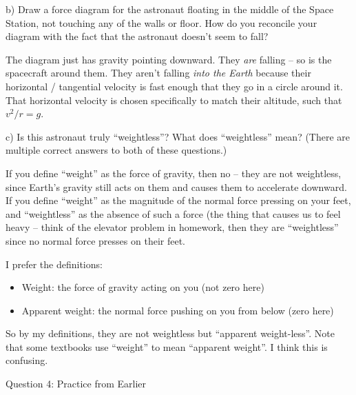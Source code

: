 \documentclass[12pt]{article}
\begin{document}
\vspace{2in}

b) Draw a force diagram for the astronaut floating in the middle of the Space Station, not touching
any of the walls or floor. How do you reconcile your diagram with the fact that the astronaut
doesn't seem to fall?

{\color{Red} The diagram just has gravity pointing downward. They {\it are} falling -- so is the spacecraft around them. They aren't falling {\it into the Earth} because their horizontal / tangential velocity is fast enough that they go in a circle around it. That horizontal velocity is chosen specifically to match their altitude, such that $v^2/r = g$.}

\vspace{2in}

c) Is this astronaut truly ``weightless''? What does ``weightless'' mean? (There are multiple correct answers to both of these questions.)

{\color{Red} If you define ``weight'' as the force of gravity, then no -- they are not weightless, since Earth's gravity still acts on them and causes them to accelerate downward. If you define ``weight'' as the magnitude of the normal force pressing on your feet, and ``weightless'' as the absence of such a force (the thing that causes us to feel heavy -- think of the elevator problem in homework, then they are ``weightless'' since no normal force presses on their feet. 

I prefer the definitions:

\begin{itemize}
	\item Weight: the force of gravity acting on you (not zero here)
	\item Apparent weight: the normal force pushing on you from below (zero here)
\end{itemize}

So by my definitions, they are not weightless but ``apparent weight-less''. Note that some textbooks use ``weight'' to mean ``apparent weight''. I think this is confusing.

}

\newpage

\newpage
\centerline{\Large Question 4: Practice from Earlier}
\end{document}
